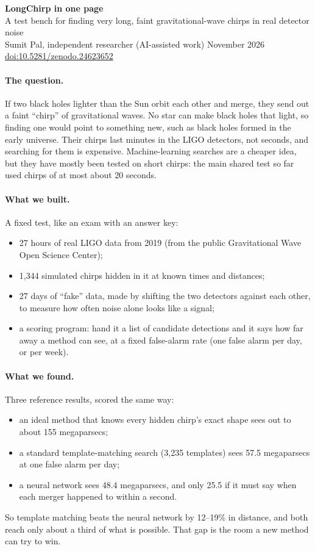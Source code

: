 \documentclass[11pt]{article}
\begin{document}
\begin{center}
{\Large\bfseries LongChirp in one page}\\[2pt]
A test bench for finding very long, faint gravitational-wave chirps in real detector noise\\[2pt]
Sumit Pal, independent researcher (AI-assisted work)  November 2026 \quad \href{https://doi.org/10.5281/zenodo.24623652}{doi:10.5281/zenodo.24623652}
\end{center}

\paragraph{The question.} If two black holes lighter than the Sun orbit each other and merge, they send out a faint
``chirp'' of gravitational waves. No star can make black holes that light, so finding one would point to something
new, such as black holes formed in the early universe. Their chirps last minutes in the LIGO detectors, not seconds,
and searching for them is expensive. Machine-learning searches are a cheaper idea, but they have mostly been tested on
short chirps: the main shared test so far used chirps of at most about 20 seconds.

\paragraph{What we built.} A fixed test, like an exam with an answer key:
\begin{itemize}
\item 27 hours of real LIGO data from 2019 (from the public Gravitational Wave Open Science Center);
\item 1,344 simulated chirps hidden in it at known times and distances;
\item 27 days of ``fake'' data, made by shifting the two detectors against each other, to measure how often noise
alone looks like a signal;
\item a scoring program: hand it a list of candidate detections and it says how far away a method can see, at a
fixed false-alarm rate (one false alarm per day, or per week).
\end{itemize}

\paragraph{What we found.} Three reference results, scored the same way:
\begin{itemize}
\item an ideal method that knows every hidden chirp's exact shape sees out to about 155 megaparsecs;
\item a standard template-matching search (3,235 templates) sees 57.5 megaparsecs at one false alarm per day;
\item a neural network sees 48.4 megaparsecs, and only 25.5 if it must say when each merger happened to within a
second.
\end{itemize}
So template matching beats the neural network by 12--19\% in distance, and both reach only about a third of what is
possible. That gap is the room a new method can try to win.
\end{document}

